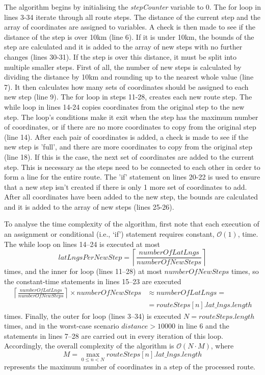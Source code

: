 \documentclass[authoryearcitations]{UoYCSproject}
\begin{document}
The algorithm begins by initialising the \textit{stepCounter} variable to 0. The for loop in lines 3-34 iterate through all route steps. The distance of the current step and the array of coordinates are assigned to variables. A check is then made to see if the distance of the step is over 10km (line 6). If it is under 10km, the bounds of the step are calculated and it is added to the array of new steps with no further changes (lines 30-31). If the step is over this distance, it must be split into multiple smaller steps. First of all, the number of new steps is calculated by dividing the distance by 10km and rounding up to the nearest whole value (line 7). It then calculates how many sets of coordinates should be assigned to each new step (line 9). The for loop in steps 11-28, creates each new route step. The while loop in lines 14-24 copies coordinates from the original step to the new step. The loop's conditions make it exit when the step has the maximum number of coordinates, or if there are no more coordinates to copy from the original step (line 14). After each pair of coordinates is added, a check is made to see if the new step is 'full', and there are more coordinates to copy from the original step (line 18). If this is the case, the next set of coordinates are added to the current step. This is necessary as the steps need to be connected to each other in order to form a line for the entire route. The 'if' statement on lines 20-22 is used to ensure that a new step isn't created if there is only 1 more set of coordinates to add. After all coordinates have been added to the new step, the bounds are calculated and it is added to the array of new steps (lines 25-26).

To analyse the time complexity of the algorithm, first note that each execution of an assignment or conditional (i.e., `if') statement requires constant, $\mathcal{O}(1)$, time. The while loop on lines 14--24 is executed at most
\[
  \mathit{latLngsPerNewStep} = \left\lceil \frac{\mathit{numberOfLatLngs}}{\mathit{numberOfNewSteps}}\right\rceil
\] 
times, and the inner for loop (lines 11--28) at most $\mathit{numberOfNewSteps}$ times, so the constant-time statements in lines 15--23 are executed
\[
 \begin{array}{ll}
  \left\lceil \frac{\mathit{numberOfLatLngs}}{\mathit{numberOfNewSteps}}\right\rceil \times \mathit{numberOfNewSteps} & \approx \mathit{numberOfLatLngs} = \\
  & = \mathit{routeSteps[n].lat\_lngs.length}
  \end{array}
\]
times. Finally, the outer for loop (lines 3--34) is executed $N=\mathit{routeSteps.length}$ times, and in the worst-case scenario $\mathit{distance}>10000$ in line 6 and the statements in lines 7--28 are carried out in every iteration of this loop. Accordingly, the overall complexity of the algorithm is $\mathcal{O}(N \cdot M)$, where 
\[
  M = \max_{0\leq n<N} \mathit{routeSteps[n].lat\_lngs.length}
\]
represents the maximum number of coordinates in a step of the processed route.
\end{document}
